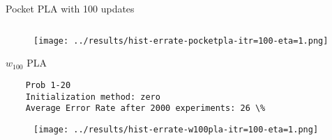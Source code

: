 \documentclass[12pt]{article}
\newenvironment{prob}[2][Prob.]{\begin{trivlist}
\item[\hskip \labelsep {\bfseries #1}\hskip \labelsep {\bfseries #2}]}{\end{trivlist}}
\begin{document}
\begin{CJK}{UTF8}{bsmi}
\begin{prob}{19} - Pocket PLA with 100 updates\\
\begin{lstlisting}
\end{lstlisting}
\begin{figure}[H]
	\centering
	\texttt{[image: ../results/hist-errate-pocketpla-itr=100-eta=1.png]}
	\caption{}
	\label{fig-1-19}
\end{figure}
\end{prob}

\begin{prob}{20} - $w_{100}$ PLA\\
\begin{lstlisting}
	Prob 1-20
	Initialization method: zero
	Average Error Rate after 2000 experiments: 26 \%
\end{lstlisting}
\begin{figure}[H]
	\centering
	\texttt{[image: ../results/hist-errate-w100pla-itr=100-eta=1.png]}
	\caption{}
	\label{fig-1-20}
\end{figure}
\end{prob}

\end{CJK} 
\end{document}
